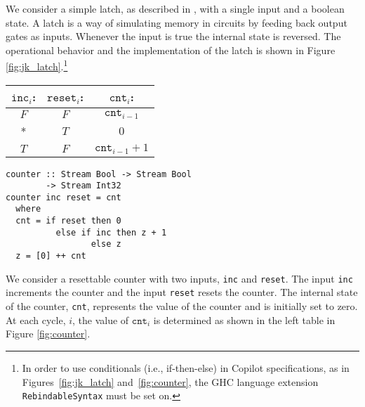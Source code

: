 \begin{example}
We consider a simple latch, as described in \cite{Farhat2004}, with a single
input and a boolean state. A latch is a way of simulating memory in circuits by feeding
back output gates as inputs.  Whenever the input is true the internal state is reversed.
The operational behavior and the implementation of the latch is shown in Figure
\ref{fig:jk_latch}.\footnote
{In order
to use conditionals (i.e., if-then-else) in Copilot specifications,
as in Figures~\ref{fig:jk_latch} and~\ref{fig:counter}, the GHC
language extension {\tt RebindableSyntax} must be set on.}
\end{example}

\begin{figure*}
\begin{minipage}{0.4\linewidth}
\begin{tabular}{c|c||c}
$\mathtt{inc}_i$: & $\mathtt{reset}_i$: & $\mathtt{cnt}_i$: \\
\hline
$F$ & $F$ & $\mathtt{cnt}_{i-1}$ \\
\hline
* & $T$ & $0$ \\
\hline
$T$ & $F$ & $\mathtt{cnt}_{i-1} + 1$ \\
\hline
\end{tabular}
\end{minipage}
\hspace{1cm}
\begin{minipage}{0.6\linewidth}
\begin{lstlisting}[language = Copilot, frame = none]
counter :: Stream Bool -> Stream Bool
        -> Stream Int32
counter inc reset = cnt
  where
  cnt = if reset then 0
          else if inc then z + 1
                 else z
  z = [0] ++ cnt
\end{lstlisting}
\end{minipage}
\caption{A resettable counter. The specification is provided at the left and the
implementation is provided at the right.
}
\label{fig:counter}
\end{figure*}

\begin{example}
We consider a resettable counter with two inputs, {\tt inc} and {\tt reset}.
The input {\tt inc} increments the counter and the input {\tt reset} resets the
counter. The internal state of the counter, {\tt cnt}, represents the value of the
counter and is initially set to zero. At each cycle, $i$, the value of
$\mathtt{cnt}_i$ is determined as shown in the left table in Figure
\ref{fig:counter}.
\end{example}

